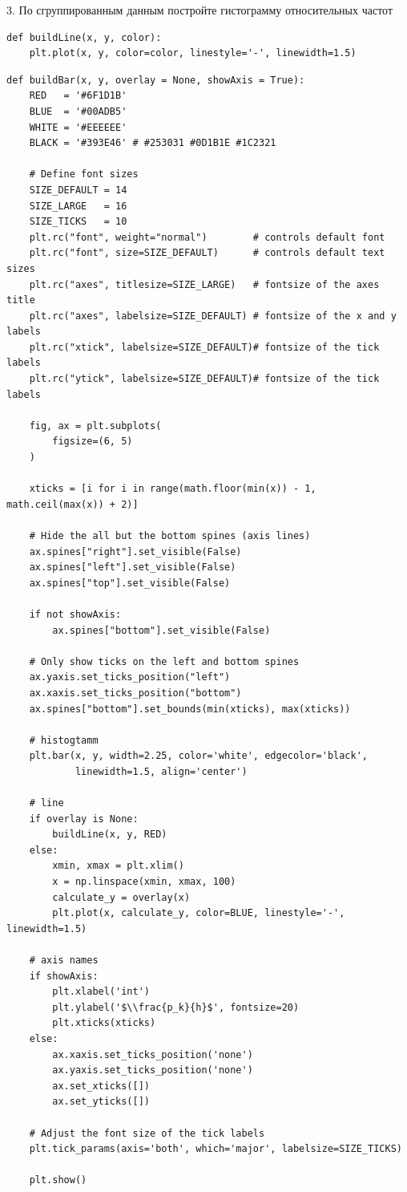 \documentclass[a4paper, 14pt]{extarticle}
\begin{document}
\begin{center}
    3. По сгруппированным данным постройте гистограмму относительных частот
\end{center}

\begin{lstlisting}
def buildLine(x, y, color):
    plt.plot(x, y, color=color, linestyle='-', linewidth=1.5)
\end{lstlisting}

\begin{lstlisting}[caption={Построение гистограммы}, label={lst:9}]
def buildBar(x, y, overlay = None, showAxis = True):
    RED   = '#6F1D1B'
    BLUE  = '#00ADB5'
    WHITE = '#EEEEEE'
    BLACK = '#393E46' # #253031 #0D1B1E #1C2321

    # Define font sizes
    SIZE_DEFAULT = 14
    SIZE_LARGE   = 16
    SIZE_TICKS   = 10
    plt.rc("font", weight="normal")        # controls default font
    plt.rc("font", size=SIZE_DEFAULT)      # controls default text sizes
    plt.rc("axes", titlesize=SIZE_LARGE)   # fontsize of the axes title
    plt.rc("axes", labelsize=SIZE_DEFAULT) # fontsize of the x and y labels
    plt.rc("xtick", labelsize=SIZE_DEFAULT)# fontsize of the tick labels
    plt.rc("ytick", labelsize=SIZE_DEFAULT)# fontsize of the tick labels

    fig, ax = plt.subplots(
        figsize=(6, 5)
    )

    xticks = [i for i in range(math.floor(min(x)) - 1, math.ceil(max(x)) + 2)]

    # Hide the all but the bottom spines (axis lines)
    ax.spines["right"].set_visible(False)
    ax.spines["left"].set_visible(False)
    ax.spines["top"].set_visible(False)

    if not showAxis:
        ax.spines["bottom"].set_visible(False)

    # Only show ticks on the left and bottom spines
    ax.yaxis.set_ticks_position("left")
    ax.xaxis.set_ticks_position("bottom")
    ax.spines["bottom"].set_bounds(min(xticks), max(xticks))

    # histogtamm 
    plt.bar(x, y, width=2.25, color='white', edgecolor='black', 
            linewidth=1.5, align='center')

    # line
    if overlay is None:
        buildLine(x, y, RED)
    else:
        xmin, xmax = plt.xlim()
        x = np.linspace(xmin, xmax, 100)
        calculate_y = overlay(x)
        plt.plot(x, calculate_y, color=BLUE, linestyle='-', linewidth=1.5)

    # axis names
    if showAxis:
        plt.xlabel('int')
        plt.ylabel('$\\frac{p_k}{h}$', fontsize=20)
        plt.xticks(xticks)
    else:
        ax.xaxis.set_ticks_position('none')
        ax.yaxis.set_ticks_position('none')
        ax.set_xticks([])
        ax.set_yticks([])

    # Adjust the font size of the tick labels
    plt.tick_params(axis='both', which='major', labelsize=SIZE_TICKS)

    plt.show()
\end{lstlisting}
\end{document}
